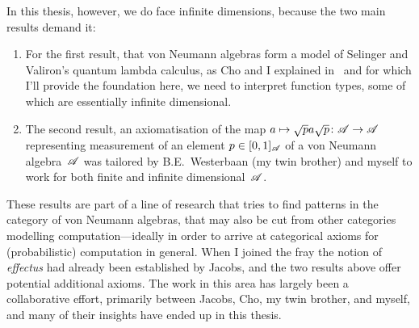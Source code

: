 \documentclass[b5paper]{book}
\begin{document}
\begin{parsec}{10}
\begin{point}{20}%
In this thesis, however,
we do face infinite dimensions,
because the two main results demand it:
\begin{enumerate}
\item
For the first result,
that von Neumann algebras
form  a model of Selinger and Valiron's quantum lambda calculus,
		as Cho and I explained in~\cite{model}
and for which I'll provide the foundation here,
we need to interpret function types,
some of which are essentially infinite dimensional.
\item
The second result,
an axiomatisation
of the map $a\mapsto \sqrt{p}a\sqrt{p}\colon \mathscr{A}\to\mathscr{A}$
representing measurement
of an element $p\in[0,1]_{\mathscr{A}}$
of a von Neumann algebra~$\mathscr{A}$
was tailored by B.E.~Westerbaan (my twin brother) and myself to work for
both finite and infinite dimensional~$\mathscr{A}$.
\end{enumerate}
These results
are part of a line of research that
tries to find patterns
in the category of von Neumann algebras,
that may also be cut from other categories
modelling computation---ideally in order to arrive at categorical axioms
for (probabilistic) computation in general.
When I joined the fray
the notion of \emph{effectus}\cite{newdirections} had already
been established by Jacobs,
and the two results
above offer potential additional axioms.
The work in this area has largely been a collaborative effort,
primarily between Jacobs, Cho, my twin brother, and myself,
and many of their insights have ended up in this thesis.


\end{point}
\end{parsec}
\end{document}
